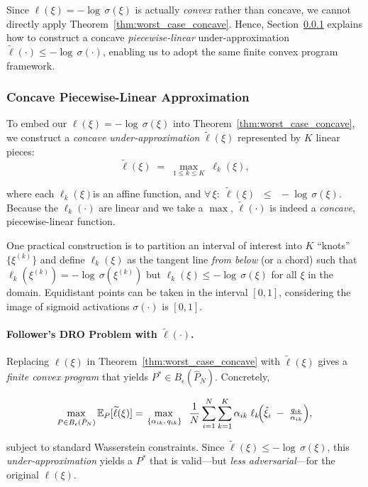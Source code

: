 Since $\ell(\xi)=-\!\log\,\sigma(\xi)$ is actually \emph{convex} rather than concave, 
we cannot directly apply Theorem~\ref{thm:worst_case_concave}. 
Hence, Section~\ref{subsec:concave_approx} explains how to construct 
a concave \emph{piecewise-linear} under-approximation 
$\widetilde{\ell}(\cdot)\le -\!\log\,\sigma(\cdot)$, 
enabling us to adopt the same finite convex program framework.

\subsubsection{Concave Piecewise-Linear Approximation}
\label{subsec:concave_approx}

To embed our \(\ell(\xi)=-\!\log\,\sigma(\xi)\) into 
Theorem~\ref{thm:worst_case_concave}, we construct a \emph{concave under-approximation} 
\(\widetilde{\ell}(\xi)\) represented by $K$ linear pieces:
\begin{equation}
\label{eq:piecewise_concave_ell}
\widetilde{\ell}(\xi)
\;=\;
\max_{1\le k\le K}\;\ell_k(\xi),
\end{equation}

where each $\ell_k(\xi)$is an affine function, and
\(\forall\,\xi:\;
\widetilde{\ell}(\xi)
\;\;\le\;\;
-\!\log\,\sigma(\xi)\).
Because the $\ell_k(\cdot)$ are linear and we take a \(\max\), 
\(\widetilde{\ell}(\cdot)\) is indeed a \emph{concave}, piecewise-linear function.  

One practical construction is to partition an interval of interest into $K$ “knots” 
$\{\xi^{(k)}\}$ and define $\ell_k(\xi)$ as the tangent line \emph{from below} 
(or a chord) such that $\ell_k(\xi^{(k)}) = -\!\log\,\sigma(\xi^{(k)})$ 
but $\ell_k(\xi)\le -\!\log\,\sigma(\xi)$ for all $\xi$ in the domain.  
Equidistant points can be taken in the interval $[0,1]$, considering the image of sigmoid activations $\sigma(\cdot)$ is $[0,1]$.

\paragraph{Follower’s DRO Problem with $\widetilde{\ell}(\cdot)$.}
Replacing \(\ell(\xi)\) in Theorem~\ref{thm:worst_case_concave} with 
$\widetilde{\ell}(\xi)$ gives a \emph{finite convex program} that yields 
$P^*\in B_\epsilon(\hat{P}_N)$.  Concretely, 
\begin{small}
  \begin{equation}
\label{eq:widetilde_dro}
\max_{P \in B_\epsilon(\hat{P}_N)}
\mathbb{E}_P[\widetilde{\ell}(\xi)]
=
\max_{\,\{\alpha_{ik},\,q_{ik}\}}
\;\;
\frac{1}{N}
\sum_{i=1}^N
\sum_{k=1}^K
\alpha_{ik}
\;\ell_k\!\Bigl(\hat{\xi}_i \;-\; \tfrac{q_{ik}}{\alpha_{ik}}\Bigr),
\end{equation}  
\end{small}
subject to standard Wasserstein constraints.  
Since $\widetilde{\ell}(\xi)\le -\!\log\,\sigma(\xi)$, 
this \emph{under-approximation} yields a $P^*$ that is valid---but 
\emph{less adversarial}---for the original $\ell(\xi)$.

